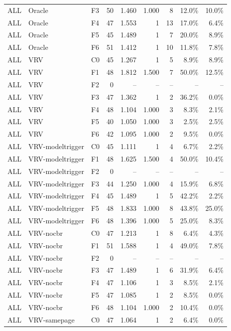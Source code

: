 \begin{tabular}{lllrrrrrr}
ALL & Oracle & F3 & 50 & 1.460 & 1.000 & 8 & 12.0\% & 10.0\% \\
ALL & Oracle & F4 & 47 & 1.553 & 1 & 13 & 17.0\% & 6.4\% \\
ALL & Oracle & F5 & 45 & 1.489 & 1 & 7 & 20.0\% & 8.9\% \\
ALL & Oracle & F6 & 51 & 1.412 & 1 & 10 & 11.8\% & 7.8\% \\
ALL & VRV & C0 & 45 & 1.267 & 1 & 5 & 8.9\% & 8.9\% \\
ALL & VRV & F1 & 48 & 1.812 & 1.500 & 7 & 50.0\% & 12.5\% \\
ALL & VRV & F2 & 0 & -- & -- & -- & -- & -- \\
ALL & VRV & F3 & 47 & 1.362 & 1 & 2 & 36.2\% & 0.0\% \\
ALL & VRV & F4 & 48 & 1.104 & 1.000 & 3 & 8.3\% & 2.1\% \\
ALL & VRV & F5 & 40 & 1.050 & 1.000 & 3 & 2.5\% & 2.5\% \\
ALL & VRV & F6 & 42 & 1.095 & 1.000 & 2 & 9.5\% & 0.0\% \\
ALL & VRV-modeltrigger & C0 & 45 & 1.111 & 1 & 4 & 6.7\% & 2.2\% \\
ALL & VRV-modeltrigger & F1 & 48 & 1.625 & 1.500 & 4 & 50.0\% & 10.4\% \\
ALL & VRV-modeltrigger & F2 & 0 & -- & -- & -- & -- & -- \\
ALL & VRV-modeltrigger & F3 & 44 & 1.250 & 1.000 & 4 & 15.9\% & 6.8\% \\
ALL & VRV-modeltrigger & F4 & 45 & 1.489 & 1 & 5 & 42.2\% & 2.2\% \\
ALL & VRV-modeltrigger & F5 & 48 & 1.833 & 1.000 & 8 & 43.8\% & 25.0\% \\
ALL & VRV-modeltrigger & F6 & 48 & 1.396 & 1.000 & 5 & 25.0\% & 8.3\% \\
ALL & VRV-nocbr & C0 & 47 & 1.213 & 1 & 8 & 6.4\% & 4.3\% \\
ALL & VRV-nocbr & F1 & 51 & 1.588 & 1 & 4 & 49.0\% & 7.8\% \\
ALL & VRV-nocbr & F2 & 0 & -- & -- & -- & -- & -- \\
ALL & VRV-nocbr & F3 & 47 & 1.489 & 1 & 6 & 31.9\% & 6.4\% \\
ALL & VRV-nocbr & F4 & 47 & 1.106 & 1 & 3 & 8.5\% & 2.1\% \\
ALL & VRV-nocbr & F5 & 47 & 1.085 & 1 & 2 & 8.5\% & 0.0\% \\
ALL & VRV-nocbr & F6 & 48 & 1.104 & 1.000 & 2 & 10.4\% & 0.0\% \\
ALL & VRV-samepage & C0 & 47 & 1.064 & 1 & 2 & 6.4\% & 0.0\% \\

\end{tabular}

